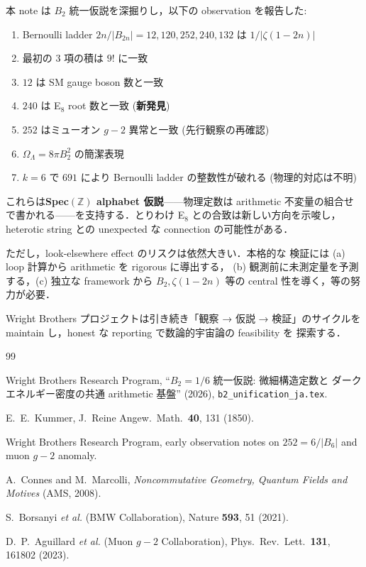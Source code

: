 \documentclass[11pt,a4paper]{article}
\begin{document}
本 note は $B_2$ 統一仮説を深掘りし，以下の observation を報告した:

\begin{enumerate}
\item Bernoulli ladder $2n/|B_{2n}| = 12, 120, 252, 240, 132$ は
$1/|\zeta(1-2n)|$
\item 最初の 3 項の積は $9!$ に一致
\item $12$ は SM gauge boson 数と一致
\item $240$ は E$_8$ root 数と一致 (\textbf{新発見})
\item $252$ はミューオン $g-2$ 異常と一致 (先行観察の再確認)
\item $\Omega_\Lambda = 8\pi B_2^2$ の簡潔表現
\item $k = 6$ で $691$ により Bernoulli ladder の整数性が破れる
(物理的対応は不明)
\end{enumerate}

これらは\textbf{Spec$(\mathbb{Z})$ alphabet 仮説}——物理定数は
arithmetic 不変量の組合せで書かれる——を支持する．とりわけ E$_8$
との合致は新しい方向を示唆し，heterotic string との unexpected な
connection の可能性がある．

ただし，look-elsewhere effect のリスクは依然大きい．本格的な
検証には (a) loop 計算から arithmetic を rigorous に導出する，
(b) 観測前に未測定量を予測する，(c) 独立な framework から
$B_2, \zeta(1-2n)$ 等の central 性を導く，等の努力が必要．

Wright Brothers プロジェクトは引き続き「観察 → 仮説 → 検証」のサイクルを
maintain し，honest な reporting で数論的宇宙論の feasibility を
探索する．

\begin{thebibliography}{99}

Wright Brothers Research Program, ``$B_2 = 1/6$ 統一仮説: 微細構造定数と
ダークエネルギー密度の共通 arithmetic 基盤'' (2026),
\texttt{b2\_unification\_ja.tex}.

E.~E.~Kummer, J.\ Reine Angew.\ Math.\ \textbf{40}, 131 (1850).

Wright Brothers Research Program, early observation notes on
$252 = 6/|B_6|$ and muon $g-2$ anomaly.

A.~Connes and M.~Marcolli, \textit{Noncommutative Geometry, Quantum
Fields and Motives} (AMS, 2008).

S.~Borsanyi \textit{et al.} (BMW Collaboration),
Nature \textbf{593}, 51 (2021).

D.~P.~Aguillard \textit{et al.} (Muon $g-2$ Collaboration),
Phys.\ Rev.\ Lett.\ \textbf{131}, 161802 (2023).

\end{thebibliography}
\end{document}
